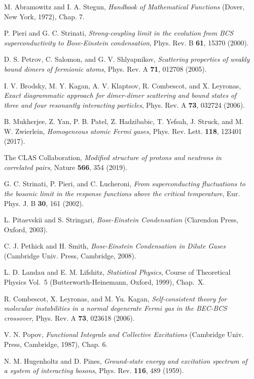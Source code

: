 \documentclass[pra,twocolumn,aps,amssymb,showpacs,superscriptaddress]{revtex4-1}
\begin{document}
\begin{thebibliography}{99}
 M. Abramowitz and I. A. Stegun, \emph{Handbook of Mathematical Functions} (Dover, New York, 1972), Chap. 7.

 P. Pieri and G. C. Strinati, \emph{Strong-coupling limit in the evolution from BCS superconductivity to Bose-Einstein condensation}, Phys. Rev. B {\bf 61}, 15370 (2000).

 D. S. Petrov, C. Salomon, and G. V. Shlyapnikov, \emph{Scattering properties of weakly bound dimers of fermionic atoms}, Phys. Rev. A {\bf 71}, 012708 (2005).

 I. V. Brodsky, M. Y. Kagan, A. V. Klaptsov, R. Combescot, and X. Leyronas, \emph{Exact diagrammatic approach for dimer-dimer scattering and bound states 
                                       of three and four resonantly interacting particles}, Phys. Rev. A {\bf 73}, 032724 (2006).

 B. Mukherjee, Z. Yan, P. B. Patel, Z. Hadzibabic, T. Yefsah, J. Struck, and M. W. Zwierlein, \emph{Homogeneous atomic Fermi gases}, Phys. Rev. Lett. {\bf 118}, 123401 (2017).

 The CLAS Collaboration, \emph{Modified structure of protons and neutrons in correlated pairs}, Nature {\bf 566}, 354 (2019).

 G. C. Strinati, P. Pieri, and C. Lucheroni, \emph{From superconducting fluctuations to the bosonic limit in the response functions above the critical temperature}, 
                                Eur. Phys. J. B {\bf 30}, 161 (2002).

 L. Pitaevskii and S. Stringari, \emph{Bose-Einstein Condensation} (Clarendon Press, Oxford, 2003).

 C. J. Pethick and H. Smith, \emph{Bose-Einstein Condensation in Dilute Gases} (Cambridge Univ. Press, Cambridge, 2008).

 L. D. Landau and E. M. Lifshitz, \emph{Statistical Physics}, Course of Theoretical Physics Vol.~5 (Butterworth-Heinemann, Oxford, 1999), Chap.~X.

 R. Combescot, X. Leyronas, and M. Yu. Kagan, \emph{Self-consistent theory for molecular instabilities in a normal degenerate Fermi gas in the BEC-BCS crossover}, 
                                           Phys. Rev. A {\bf 73}, 023618 (2006).

 V. N. Popov, \emph{Functional Integrals and Collective Excitations} (Cambridge Univ. Press, Cambridge, 1987), Chap. 6.

 N. M. Hugenholtz and D. Pines, \emph{Ground-state energy and excitation spectrum of a system of interacting bosons}, Phys. Rev. {\bf 116}, 489 (1959).

\end{thebibliography}
\end{document}
